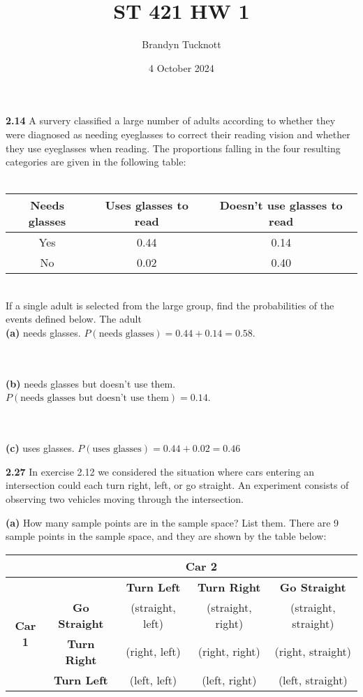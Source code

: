 \documentclass{exam}
\title{ST 421 HW 1}
\author{Brandyn Tucknott}
\date{4 October 2024}
\begin{document}
\maketitle

\begin{questions}
    \textbf{2.14 } A survery classified a large number of adults according to whether they were diagnosed as needing eyeglasses to correct their reading vision and whether they use eyeglasses when reading. The proportions falling in the four resulting categories are given in the following table: \\ \\
\begin{tabular}{c|c|c}
    Needs glasses & Uses glasses to read & Doesn't use glasses to read \\
    \hline
    Yes & 0.44 & 0.14 \\
    No & 0.02 & 0.40
\end{tabular} \\

If a single adult is selected from the large group, find the probabilities of the events defined below. The adult \\
\textbf{(a) } needs glasses.
\sol
$P(\text{needs glasses}) = 0.44 + 0.14 = 0.58$.

\\ \\
\textbf{(b) } needs glasses but doesn't use them.
\sol
$P(\text{needs glasses but doesn't use them}) = 0.14$.

\\ \\
\textbf{(c) } uses glasses.
\sol
$P(\text{uses glasses}) = 0.44 + 0.02 = 0.46$


\newpage


\textbf{2.27 } In exercise 2.12 we considered the situation where cars entering an intersection could each turn right, left, or go straight. An experiment consists of observing two vehicles moving through the intersection.

\textbf{(a) } How many sample points are in the sample space? List them.
\sol
There are 9 sample points in the sample space, and they are shown by the table below:

\begin{tabular}{|c|c|c|c|c|}
    \hline
    \multicolumn{1}{|c|}{} & \multicolumn{4}{|c|}{\textbf{Car 2}} \\  %
    \hline
    \multirow{4}{*}{\textbf{Car 1}} &  & \textbf{Turn Left} & \textbf{Turn Right} & \textbf{Go Straight} \\  %
    \cline{2-5} %
    & \textbf{Go Straight} & (straight, left) & (straight, right) & (straight, straight) \\
    \cline{2-5}
    & \textbf{Turn Right} & (right, left) & (right, right) & (right, straight) \\
    \cline{2-5}
    & \textbf{Turn Left} & (left, left) & (left, right) & (left, straight) \\
    \hline
\end{tabular}



\end{questions}
\end{document}
